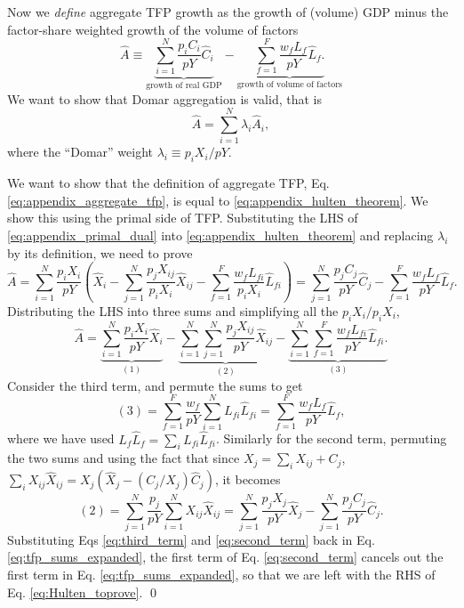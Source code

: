 Now we \textit{define} aggregate TFP growth as the growth of (volume) GDP minus the factor-share weighted growth of the volume of factors
\begin{equation}
\hat{A} \equiv \underbrace{\sum_{i=1}^N \frac{p_iC_i}{pY} \hat{C}_i}_{\text{growth of real GDP}} - \underbrace{\sum_{f=1}^F \frac{w_f L_f}{pY} \hat{L}_f.}_{\text{growth of volume of factors}}
\label{eq:appendix_aggregate_tfp}
\end{equation}
We want to show that Domar aggregation is valid, that is
\begin{equation}
\hat{A}=\sum_{i=1}^N \lambda_i \hat{A}_i,
\label{eq:appendix_hulten_theorem}
\end{equation}
where the ``Domar'' weight $\lambda_i \equiv p_i X_i/pY$.

\proof

We want to show that the definition of aggregate TFP, Eq. \ref{eq:appendix_aggregate_tfp}, is equal to \eqref{eq:appendix_hulten_theorem}.
We show this using the primal side of TFP. Substituting the LHS of \eqref{eq:appendix_primal_dual} into \eqref{eq:appendix_hulten_theorem} and replacing $\lambda_i$ by its definition, we need to prove
\begin{equation}
\hat{A} = \sum_{i=1}^N \frac{p_iX_i}{pY} \left( \hat{X}_i - \sum_{j=1}^N  \frac{p_jX_{ij}}{p_iX_i} \hat{X}_{ij} - \sum_{f=1}^F \frac{w_f L_{fi}}{p_iX_i} \hat{L}_{fi} \right) = \sum_{j=1}^N  \frac{p_jC_j }{pY} \hat{C}_j - \sum_{f=1}^F \frac{w_f L_f}{pY} \hat{L}_{f}.
\label{eq:Hulten_toprove}
\end{equation}
Distributing the LHS into three sums and simplifying all the $p_iX_i/p_iX_i$,
\begin{equation}
\hat{A} = \underbrace{\sum_{i=1}^N \frac{p_iX_i}{pY} \hat{X}_i}_{(1)} - \underbrace{\sum_{i=1}^N \sum_{j=1}^N  \frac{p_jX_{ij}}{pY} \hat{X}_{ij}}_{(2)} - \underbrace{\sum_{i=1}^N \sum_{f=1}^F \frac{w_f L_{fi}}{pY} \hat{L}_{fi}.}_{(3)}
\label{eq:tfp_sums_expanded}
\end{equation}
Consider the third term, and permute the sums to get
\begin{equation}
(3) = \sum_{f=1}^F \frac{w_f }{pY} \sum_{i=1}^N  L_{fi} \hat{L}_{fi} = \sum_{f=1}^F \frac{w_f L_f}{pY} \hat{L}_{f},
\label{eq:third_term}
\end{equation}
where we have used $L_f \hat{L}_f = \sum_i  L_{fi} \hat{L}_{fi}$. Similarly for the second term, permuting the two sums and using the fact that since $X_j=\sum_i X_{ij} + C_j$, $\sum_i X_{ij}\hat{X}_{ij} = X_j (\hat{X}_j - (C_j/X_j) \hat{C}_j)$, it becomes
\begin{equation}
(2) = \sum_{j=1}^N  \frac{p_j}{pY} \sum_{i=1}^N X_{ij} \hat{X}_{ij} = \sum_{j=1}^N  \frac{p_j X_j }{pY} \hat{X}_j - \sum_{j=1}^N  \frac{p_jC_j }{pY} \hat{C}_j.
\label{eq:second_term}
\end{equation}
Substituting Eqs \ref{eq:third_term} and \ref{eq:second_term} back in Eq. \ref{eq:tfp_sums_expanded}, the first term of Eq. \ref{eq:second_term} cancels out the first term in Eq. \ref{eq:tfp_sums_expanded}, so that  we are left with the RHS of Eq. \ref{eq:Hulten_toprove}. \qed
